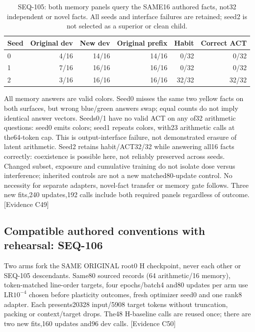 \documentclass[11pt]{article}
\newcommand{\ev}[1]{\textsf{[Evidence #1]}}
\begin{document}
\begin{table}[ht]
\centering\small
\begin{tabular}{lrrrrr}
\toprule
Seed & Original dev & New dev & Original prefix & Habit & Correct ACT \\
\midrule
0 & 4/16 & 14/16 & 14/16 & 0/32 & 0/32 \\
1 & 7/16 & 16/16 & 16/16 & 0/32 & 0/32 \\
2 & 3/16 & 16/16 & 16/16 & 32/32 & 32/32 \\
\bottomrule
\end{tabular}
\caption{SEQ-105: both memory panels query the SAME16 authored facts, not32
independent or novel facts. All seeds and interface failures are retained;
seed2 is not selected as a superior or clean child.}
\label{tab:seq105-memory}
\end{table}

All memory answers are valid colors. Seed0 misses the same two yellow facts
on both surfaces, but wrong blue/green answers swap; equal counts do not imply
identical answer vectors. Seeds0/1 have no valid ACT on any of32 arithmetic
questions: seed0 emits colors; seed1 repeats colors, with23 arithmetic calls
at the64-token cap. This is output-interface failure, not demonstrated erasure
of latent arithmetic. Seed2 retains habit/ACT32/32 while answering all16 facts
correctly: coexistence is possible here, not reliably preserved across seeds.
Changed subset, exposure and cumulative training do not isolate dose versus
interference; inherited controls are not a new matched80-update control.
No necessity for separate adapters, novel-fact transfer or memory gate follows.
Three new fits,240 updates,192 calls include both required panels regardless
of outcome. \ev{C49}

\subsection{Compatible authored conventions with rehearsal: SEQ-106}
Two arms fork the SAME ORIGINAL root0 H checkpoint, never each other or
SEQ-105 descendants. Same80 sourced records (64 arithmetic/16 memory),
token-matched line-order targets, four epochs/batch4 and80 updates per arm
use LR$10^{-4}$ chosen before plasticity outcomes, fresh optimizer seed0
and one rank8 adapter. Each presents20328 input/5908 target tokens without
truncation, packing or context/target drops. The48 H-baseline calls are
reused once; there are two new fits,160 updates and96 dev calls. \ev{C50}
\end{document}
